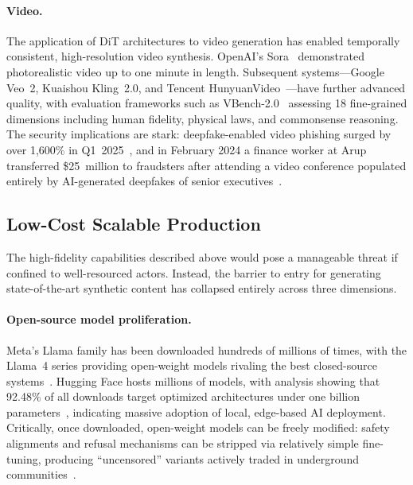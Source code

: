 \paragraph{Video.}
The application of DiT architectures to video generation has enabled temporally consistent, high-resolution video synthesis. OpenAI's Sora~\cite{brooks2024sora} demonstrated photorealistic video up to one minute in length. Subsequent systems---Google Veo~2, Kuaishou Kling~2.0, and Tencent HunyuanVideo~\cite{kong2024hunyuan}---have further advanced quality, with evaluation frameworks such as VBench-2.0~\cite{vbench2025} assessing 18 fine-grained dimensions including human fidelity, physical laws, and commonsense reasoning. The security implications are stark: deepfake-enabled video phishing surged by over 1,600\% in Q1~2025~\cite{vectra2025whaling}, and in February 2024 a finance worker at Arup transferred \$25~million to fraudsters after attending a video conference populated entirely by AI-generated deepfakes of senior executives~\cite{brightside2025phishing}.


\subsection{Low-Cost Scalable Production}
\label{sec:cap-scale}

The high-fidelity capabilities described above would pose a manageable threat if confined to well-resourced actors. Instead, the barrier to entry for generating state-of-the-art synthetic content has collapsed entirely across three dimensions.

\paragraph{Open-source model proliferation.}
Meta's Llama family has been downloaded hundreds of millions of times, with the Llama~4 series providing open-weight models rivaling the best closed-source systems~\cite{llama3}. Hugging Face hosts millions of models, with analysis showing that 92.48\% of all downloads target optimized architectures under one billion parameters~\cite{hfstats2025}, indicating massive adoption of local, edge-based AI deployment. Critically, once downloaded, open-weight models can be freely modified: safety alignments and refusal mechanisms can be stripped via relatively simple fine-tuning, producing ``uncensored'' variants actively traded in underground communities~\cite{aisafetyreport2025}.

